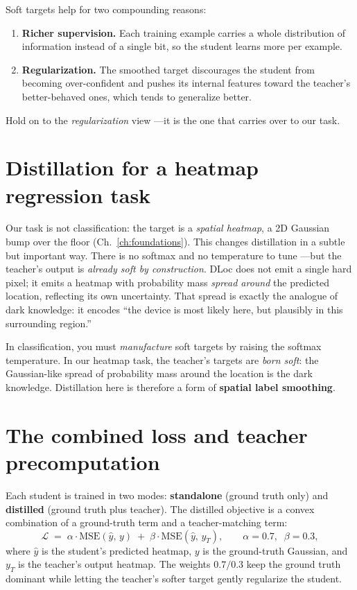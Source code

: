 Soft targets help for two compounding reasons:
\begin{enumerate}[leftmargin=1.6em,nosep]
  \item \textbf{Richer supervision.} Each training example carries a whole distribution of
  information instead of a single bit, so the student learns more per example.
  \item \textbf{Regularization.} The smoothed target discourages the student from becoming
  over-confident and pushes its internal features toward the teacher's better-behaved ones, which
  tends to generalize better.
\end{enumerate}
Hold on to the \emph{regularization} view ---it is the one that carries over to our task.

\section{Distillation for a heatmap regression task}
\label{sec:distill:ours}

Our task is not classification: the target is a \emph{spatial heatmap}, a 2D Gaussian bump over the
floor (Ch.~\ref{ch:foundations}). This changes distillation in a subtle but important way. There is no
softmax and no temperature to tune ---but the teacher's output is \emph{already soft by
construction}. DLoc does not emit a single hard pixel; it emits a heatmap with probability mass
\emph{spread around} the predicted location, reflecting its own uncertainty. That spread is exactly
the analogue of dark knowledge: it encodes ``the device is most likely here, but plausibly in this
surrounding region.''

\begin{keyidea}
In classification, you must \emph{manufacture} soft targets by raising the softmax temperature. In our
heatmap task, the teacher's targets are \emph{born soft}: the Gaussian-like spread of probability mass
around the location is the dark knowledge. Distillation here is therefore a form of \textbf{spatial
label smoothing}.
\end{keyidea}

\section{The combined loss and teacher precomputation}
\label{sec:distill:loss}

Each student is trained in two modes: \textbf{standalone} (ground truth only) and \textbf{distilled}
(ground truth plus teacher). The distilled objective is a convex combination of a ground-truth term
and a teacher-matching term:
\[
  \mathcal{L} \;=\; \alpha\cdot \mathrm{MSE}(\hat{y},\,y) \;+\; \beta\cdot \mathrm{MSE}(\hat{y},\,y_T),
  \qquad \alpha = 0.7,\;\; \beta = 0.3,
\]
where $\hat y$ is the student's predicted heatmap, $y$ is the ground-truth Gaussian, and $y_T$ is the
teacher's output heatmap. The weights $0.7/0.3$ keep the ground truth dominant while letting the
teacher's softer target gently regularize the student.

